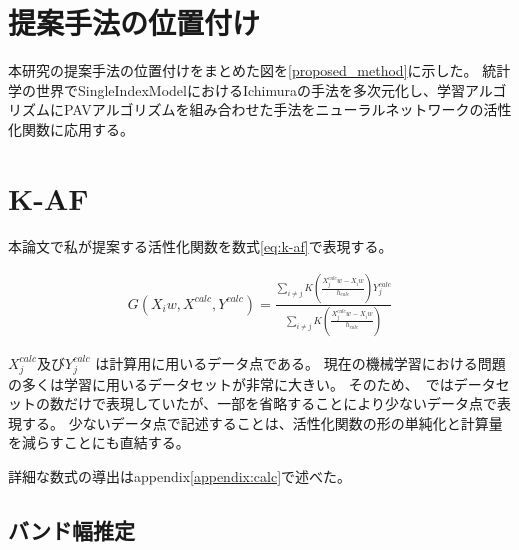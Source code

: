 \section{提案手法の位置付け}
\label {position_proposed}

本研究の提案手法の位置付けをまとめた図を\ref{proposed_method}に示した。
統計学の世界でSingleIndexModelにおけるIchimuraの手法を多次元化し、学習アルゴリズムにPAVアルゴリズムを組み合わせた手法をニューラルネットワークの活性化関数に応用する。



\section{K-AF}
\label {math}
本論文で私が提案する活性化関数を数式\ref{eq:k-af}で表現する。

\begin{eqnarray}
G(X_iw, X^{calc}, Y^{calc})=\frac{\sum_{i\neq j} K\left(\frac{X^{calc}_j w - X_i w}{h_{calc}}\right)Y^{calc}_j}{\sum_{i\neq j} K\left(\frac{X^{calc}_j w - X_i w}{h_{calc}}\right)}
\label{eq:k-af}
\end{eqnarray}


$ X^{calc}_j $及び$ Y^{calc}_j $ は計算用に用いるデータ点である。
現在の機械学習における問題の多くは学習に用いるデータセットが非常に大きい。
そのため、~\cite{ichimura}ではデータセットの数だけで表現していたが、一部を省略することにより少ないデータ点で表現する。
少ないデータ点で記述することは、活性化関数の形の単純化と計算量を減らすことにも直結する。

詳細な数式の導出はappendix\ref{appendix:calc}で述べた。


\subsection{バンド幅推定}


